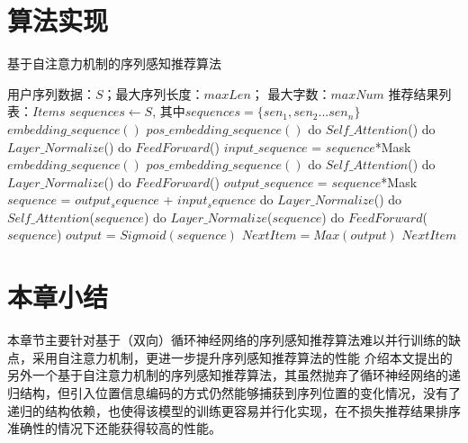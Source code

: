 \section{算法实现}
\begin{algorithm}[H]
	\caption{基于自注意力机制的序列感知推荐算法}
	\label{alg:self-attention}
		\begin{algorithmic}[1]
			\REQUIRE 用户序列数据：$S$；最大序列长度：$maxLen$； 最大字数：$maxNum$
			\ENSURE 推荐结果列表：$Items$
			\STATE $sequences \leftarrow S$, 其中$sequences=\{sen_{1}, sen_{2}...sen_{n}\}$ 
			    \STATE $embedding\_sequence()$
			    \STATE $pos\_embedding\_sequence()$
					    \STATE do $Self\_Attention$()
					    \STATE do $Layer\_Normalize$()
					    \STATE do $FeedForward$()
					    \STATE $input\_sequence$ = $sequence$*Mask
					\ENDFOR
			\ENDFOR
			    \STATE $embedding\_sequence()$
			    \STATE $pos\_embedding\_sequence()$
					    \STATE do $Self\_Attention$()
					    \STATE do $Layer\_Normalize$()
					    \STATE do $FeedForward$()
					    \STATE $output\_sequence$ = $sequence$*Mask
					\ENDFOR
			\ENDFOR
			\STATE $sequence$ = $output_sequence$ + $input_sequence$
			\STATE do $Layer\_Normalize$()
			    \STATE do $Self\_Attention$($sequence$)
			    \STATE do $Layer\_Normalize$($sequence$)
			    \STATE do $FeedForward$($sequence$)
			\ENDFOR
			\STATE $output$ = $Sigmoid(sequence)$
			\STATE $NextItem = Max(output) $
			\RETURN $NextItem$
		\end{algorithmic}
\end{algorithm}


\section{本章小结}

本章节主要针对基于（双向）循环神经网络的序列感知推荐算法难以并行训练的缺点，采用自注意力机制，更进一步提升序列感知推荐算法的性能
介绍本文提出的另外一个基于自注意力机制的序列感知推荐算法，其虽然抛弃了循环神经网络的递归结构，但引入位置信息编码的方式仍然能够捕获到序列位置的变化情况，没有了递归的结构依赖，也使得该模型的训练更容易并行化实现，在不损失推荐结果排序准确性的情况下还能获得较高的性能。

